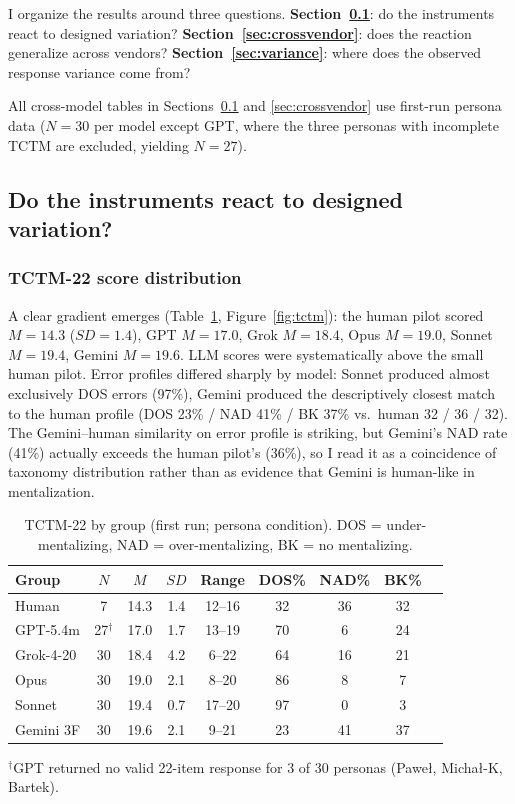 \documentclass[11pt,a4paper]{article}
\begin{document}
I organize the results around three questions. \textbf{Section~\ref{sec:react}}: do the instruments react to designed variation? \textbf{Section~\ref{sec:crossvendor}}: does the reaction generalize across vendors? \textbf{Section~\ref{sec:variance}}: where does the observed response variance come from?

All cross-model tables in Sections~\ref{sec:react} and \ref{sec:crossvendor} use first-run persona data ($N = 30$ per model except GPT, where the three personas with incomplete TCTM are excluded, yielding $N = 27$).

\subsection{Do the instruments react to designed variation?}\label{sec:react}

\subsubsection*{TCTM-22 score distribution}

A clear gradient emerges (Table~\ref{tab:tctm}, Figure~\ref{fig:tctm}): the human pilot scored $M = 14.3$ ($SD = 1.4$), GPT $M = 17.0$, Grok $M = 18.4$, Opus $M = 19.0$, Sonnet $M = 19.4$, Gemini $M = 19.6$. LLM scores were systematically above the small human pilot. Error profiles differed sharply by model: Sonnet produced almost exclusively DOS errors (97\%), Gemini produced the descriptively closest match to the human profile (DOS 23\% / NAD 41\% / BK 37\% vs.\ human 32 / 36 / 32). The Gemini--human similarity on error profile is striking, but Gemini's NAD rate (41\%) actually exceeds the human pilot's (36\%), so I read it as a coincidence of taxonomy distribution rather than as evidence that Gemini is human-like in mentalization.

\begin{table}[htbp]\centering\footnotesize
\caption{TCTM-22 by group (first run; persona condition). DOS = under-mentalizing, NAD = over-mentalizing, BK = no mentalizing.}
\label{tab:tctm}
\begin{tabular}{lcccccccc}
\toprule
\textbf{Group} & $N$ & $M$ & $SD$ & Range & DOS\% & NAD\% & BK\% \\
\midrule
Human       & 7  & 14.3 & 1.4 & 12--16 & 32 & 36 & 32 \\
GPT-5.4m    & 27$^\dagger$ & 17.0 & 1.7 & 13--19 & 70 & 6 & 24 \\
Grok-4-20   & 30 & 18.4 & 4.2 & 6--22  & 64 & 16 & 21 \\
Opus        & 30 & 19.0 & 2.1 & 8--20  & 86 & 8 & 7 \\
Sonnet      & 30 & 19.4 & 0.7 & 17--20 & 97 & 0 & 3 \\
Gemini 3F   & 30 & 19.6 & 2.1 & 9--21  & 23 & 41 & 37 \\
\bottomrule
\end{tabular}
\begin{flushleft}
\footnotesize $^\dagger$GPT returned no valid 22-item response for 3 of 30 personas (Pawe{\l}, Micha{\l}-K, Bartek).
\end{flushleft}
\end{table}
\end{document}
